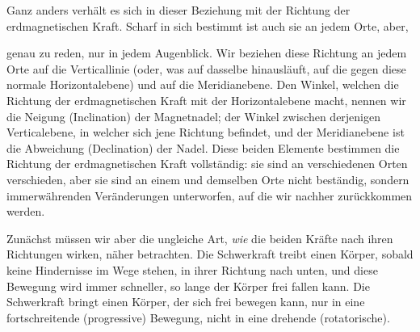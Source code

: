 Ganz anders verhält es sich in dieser Beziehung mit der Richtung der erdmagnetischen Kraft. Scharf in sich bestimmt ist auch sie an jedem Orte, aber,
\par\clearpage
{}
\noindent genau zu reden, nur in jedem Augenblick. Wir beziehen diese Richtung an jedem Orte auf die Verticallinie (oder, was auf dasselbe hinausläuft, auf die gegen diese normale Horizontalebene) und auf die Meridianebene. Den Winkel, welchen die Richtung der erdmagnetischen Kraft mit der Horizontalebene macht, nennen wir die Neigung (Inclination) der Magnetnadel; der Winkel zwischen derjenigen Verticalebene, in welcher sich jene Richtung befindet, und der Meridianebene ist die Abweichung (Declination) der Nadel. Diese beiden Elemente bestimmen die Richtung der erdmagnetischen Kraft vollständig: sie sind an verschiedenen Orten verschieden, aber sie sind an einem und demselben Orte nicht beständig, sondern immerwährenden Veränderungen unterworfen, auf die wir nachher zurückkommen werden.

Zunächst müssen wir aber die ungleiche Art, \textit{wie} die beiden Kräfte nach ihren Richtungen wirken, näher betrachten. Die Schwerkraft treibt einen Körper, sobald keine Hindernisse im Wege stehen, in ihrer Richtung nach unten, und diese Bewegung wird immer schneller, so lange der Körper frei fallen kann. Die Schwerkraft bringt einen Körper, der sich frei bewegen kann, nur in eine fortschreitende (progressive) Bewegung, nicht in eine drehende (rotatorische).

